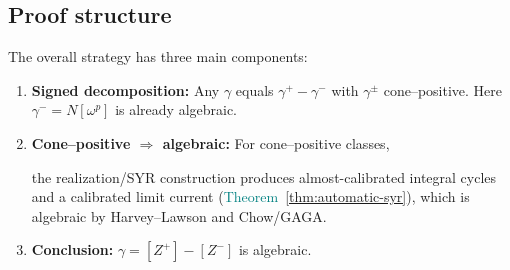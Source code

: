\documentclass[11pt]{article}
\newcommand{\REVMZ}[1]{\textcolor{teal}{#1}}  %
\numberwithin{equation}{section}  %
\theoremstyle{plain}
\theoremstyle{definition}
\theoremstyle{remark}
\begin{document}
\subsection*{Proof structure}

The overall strategy has three main components:
\begin{enumerate}
\item \textbf{Signed decomposition:} Any $\gamma$ equals $\gamma^{+} - \gamma^{-}$
with $\gamma^{\pm}$ cone--positive.  Here $\gamma^{-} = N[\omega^{p}]$ is already
algebraic.
\item \textbf{Cone--positive $\Rightarrow$ algebraic:} For cone--positive classes,

the realization/SYR construction produces almost-calibrated integral cycles and a calibrated limit current (\REVMZ{Theorem~\ref{thm:automatic-syr}}), which is
algebraic by Harvey--Lawson and Chow/GAGA.

\item \textbf{Conclusion:}
$\gamma = [Z^{+}] - [Z^{-}]$ is algebraic.
\end{enumerate}
\end{document}
